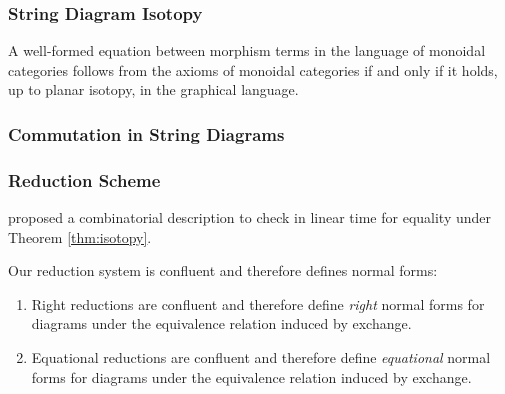 \documentclass[math, english, info, noamsthm]{beamercours}
\begin{document}
\begin{frame}
	\frametitle{String Diagram Isotopy}
	\begin{thm}
		\label{thm:isotopy}
		A well-formed equation between morphism terms in the language of monoidal categories follows from the axioms of monoidal categories if and only if it holds, up to planar isotopy, in the graphical language.
	\end{thm}
\end{frame}

\begin{frame}[fragile]
	\frametitle{Commutation in String Diagrams}
\end{frame}

\begin{frame}
	\frametitle{Reduction Scheme}
	\cite{delpeuchNormalizationPlanarString2022} proposed a combinatorial description to check
	in linear time for equality under Theorem \ref{thm:isotopy}.

	\pause\smallskip

	\begin{thm}[Confluence]\label{thm:confluence}
		Our reduction system is confluent and therefore defines normal forms:
		\begin{enumerate}
			\item Right reductions are confluent and therefore define \emph{right} normal forms for
			      diagrams under the equivalence relation induced by exchange.
			\item Equational reductions are confluent and therefore define \emph{equational}
			      normal forms for diagrams under the equivalence relation induced by exchange.
		\end{enumerate}
	\end{thm}
\end{frame}
\end{document}
